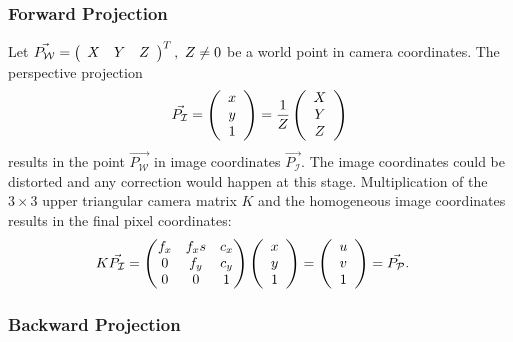 \subsubsection*{Forward Projection}

Let $\vec{P_\mathcal{W}} = \left(\begin{array}{ccc} X & Y & Z \end{array}\right)^T,~Z \neq 0$ be a world point in camera coordinates.
The perspective projection
\begin{equation}
    \vec{P_\mathcal{I}} = \left(\begin{array}{c} x \\ y \\ 1 \end{array}\right) = \frac{1}{Z}\left(\begin{array}{c} X \\ Y \\ Z \end{array}\right)
    \label{eq:pinhole_forward}
\end{equation}
results in the point $\vec{P_\mathcal{W}}$ in image coordinates $\vec{P_\mathcal{I}}$.
The image coordinates could be distorted and any correction would happen at this stage.
Multiplication of the $3 \times 3$ upper triangular camera matrix $K$ and the homogeneous image coordinates results in the final pixel coordinates:
\begin{equation}
\begin{aligned}
    K \vec{P_\mathcal{I}} &= \begin{pmatrix}
        f_x & f_x s & c_x \\
        0   & f_y   & c_y \\
        0   & 0     & 1
    \end{pmatrix}\left(\begin{array}{c} x \\ y \\ 1 \end{array}\right) = \left(\begin{array}{c} u \\ v \\ 1 \end{array}\right) = \vec{P_\mathcal{P}}\text{.}
\end{aligned}
\end{equation}

\subsubsection*{Backward Projection}

